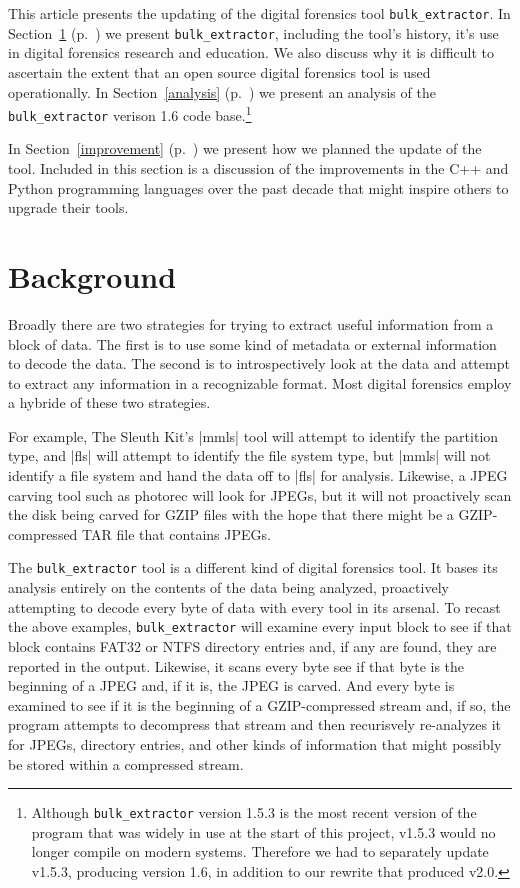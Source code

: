 \documentclass[5p]{elsarticle}
\newcommand{\be}{\texttt{bulk\_extractor}\xspace}
\newcommand{\secref}[1]{Section~\ref{#1} (p.~\pageref{#1})}
\begin{document}
This article presents the updating of the digital forensics tool \be.
In \secref{background} we present \be, including the tool's history,
it's use in digital forensics research and education. We also discuss
why it is difficult to ascertain the extent that an open source digital
forensics tool is used operationally. In \secref{analysis} we present
an analysis of the \be verison 1.6 code base.\footnote{Although \be version 1.5.3
is the most recent version of the program that was widely in use at
the start of this project, v1.5.3 would
no longer compile on modern systems. Therefore we had to separately
update v1.5.3, producing version 1.6, in addition to our rewrite that
produced v2.0.}

In \secref{improvement} we present how we planned the update of the
tool. Included in this section is a discussion of the improvements in
the C++ and Python programming languages over the past decade that
might inspire others to upgrade their tools.

\section{Background}\label{background}

Broadly there are two strategies for trying to extract useful
information from a block of data. The first is to use some kind of metadata or external
information to decode the data. The second is to introspectively look
at the data and attempt to extract any information in a recognizable
format. Most digital forensics employ a hybride of these two
strategies.

For example, The Sleuth Kit's |mmls| tool will attempt to identify the
partition type, and |fls| will attempt to identify the file system
type, but |mmls| will not identify a file system and hand the data off
to |fls| for analysis. Likewise, a JPEG carving tool such as photorec
will look for JPEGs, but it will not proactively scan the disk being
carved for GZIP files with the hope that there might be a
GZIP-compressed TAR file that contains JPEGs.

The \be tool is a different kind of digital forensics tool. It bases
its analysis entirely on the contents of the data being analyzed,
proactively attempting to decode every byte of data with every tool in
its arsenal. To recast the above examples, \be will examine every
input block to see if that block contains FAT32 or NTFS directory
entries and, if any are found, they are reported in the
output. Likewise, it scans every byte see if that byte is the
beginning of a JPEG and, if it is, the JPEG is carved. And every byte
is examined to see if it is the beginning of a GZIP-compressed stream
and, if so, the program attempts to decompress that stream and then
recurisvely re-analyzes it for JPEGs, directory entries, and other
kinds of information that might possibly be stored within a compressed
stream.
\end{document}

